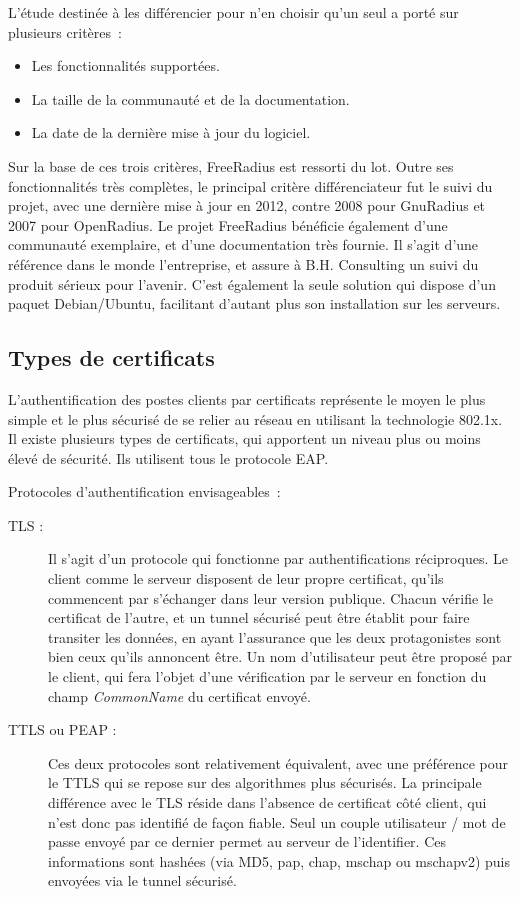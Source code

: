 L'étude destinée à les différencier pour n'en choisir qu'un seul a porté sur plusieurs critères~:

\begin{itemize}
\item Les fonctionnalités supportées.
\item La taille de la communauté et de la documentation.
\item La date de la dernière mise à jour du logiciel.
\end{itemize}

Sur la base de ces trois critères, FreeRadius est ressorti du lot. Outre ses fonctionnalités très complètes, le principal critère différenciateur fut le suivi du projet, avec une dernière mise à jour en 2012, contre 2008 pour GnuRadius et 2007 pour OpenRadius. Le projet FreeRadius bénéficie également d'une communauté exemplaire, et d'une documentation très fournie. Il s'agit d'une référence dans le monde l'entreprise, et assure à B.H. Consulting un suivi du produit sérieux pour l'avenir. C'est également la seule solution qui dispose d'un paquet Debian/Ubuntu, facilitant d'autant plus son installation sur les serveurs.

\subsection{Types de certificats}

L'authentification des postes clients par certificats représente le moyen le plus simple et le plus sécurisé de se relier au réseau en utilisant la technologie 802.1x. Il existe plusieurs types de certificats, qui apportent un niveau plus ou moins élevé de sécurité. Ils utilisent tous le protocole EAP.

Protocoles d'authentification envisageables~:

\begin{description}
\item[TLS :] Il s'agit d'un protocole qui fonctionne par authentifications réciproques. Le client comme le serveur disposent de leur propre certificat, qu'ils commencent par s'échanger dans leur version publique. Chacun vérifie le certificat de l'autre, et un tunnel sécurisé peut être établit pour faire transiter les données, en ayant l'assurance que les deux protagonistes sont bien ceux qu'ils annoncent être. Un nom d'utilisateur peut être proposé par le client, qui fera l'objet d'une vérification par le serveur en fonction du champ \textit{CommonName} du certificat envoyé.
\item[TTLS ou PEAP :] Ces deux protocoles sont relativement équivalent, avec une préférence pour le TTLS qui se repose sur des algorithmes plus sécurisés. La principale différence avec le TLS réside dans l'absence de certificat côté client, qui n'est donc pas identifié de façon fiable. Seul un couple utilisateur / mot de passe envoyé par ce dernier permet au serveur de l'identifier. Ces informations sont hashées (via MD5, pap, chap, mschap ou mschapv2) puis envoyées via le tunnel sécurisé.
\end{description}

